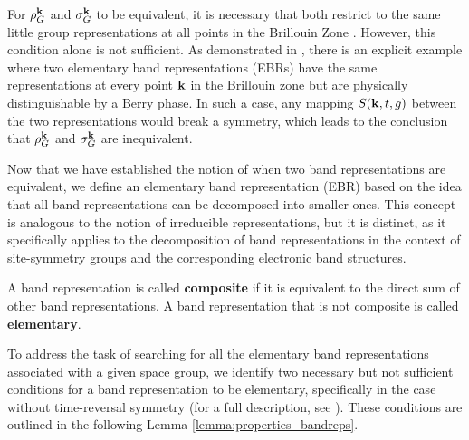 For \( \rho_G^{\vb{k}} \) and \( \sigma_G^{\vb{k}} \) to be equivalent, it is necessary that both restrict to the same little group representations at all points in the Brillouin Zone \cite{building_blocks2018}. However, this condition alone is not sufficient. As demonstrated in \cite{building_blocks2018}, there is an explicit example where two elementary band representations (EBRs) have the same representations at every point ${\vb{k}}$ in the Brillouin zone but are physically distinguishable by a Berry phase. In such a case, any mapping \( S({\vb{k}},t,g) \) between the two representations would break a symmetry, which leads to the conclusion that \( \rho_G^{\vb{k}} \) and \( \sigma_G^{\vb{k}} \) are inequivalent.

Now that we have established the notion of when two band representations are equivalent, we define an elementary band representation (EBR) based on the idea that all band representations can be decomposed into smaller ones. This concept is analogous to the notion of irreducible representations, but it is distinct, as it specifically applies to the decomposition of band representations in the context of site-symmetry groups and the corresponding electronic band structures.

\begin{definition}
A band representation is called \textbf{composite} if it is equivalent to the direct sum of other band representations. A band representation that is not composite is called \textbf{elementary}.
\end{definition}

To address the task of searching for all the elementary band representations associated with a given space group, we identify two necessary but not sufficient conditions for a band representation to be elementary, specifically in the case without time-reversal symmetry (for a full description, see \cite{building_blocks2018}). These conditions are outlined in the following Lemma \ref{lemma:properties_bandreps}.

